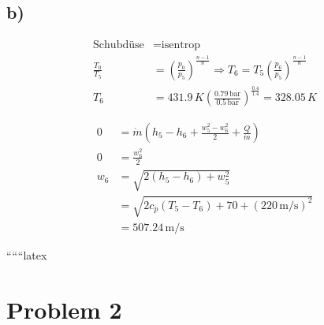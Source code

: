 

\subsection*{b)}

\begin{align*}
\text{Schubdüse} & = \text{isentrop} \\
\frac{T_0}{T_5} & = \left( \frac{p_0}{p_5} \right)^{\frac{n-1}{n}} \Rightarrow T_6 = T_5 \left( \frac{p_6}{p_5} \right)^{\frac{n-1}{n}} \\
T_6 & = 431.9 \, K \left( \frac{0.79 \, \text{bar}}{0.5 \, \text{bar}} \right)^{\frac{0.4}{1.4}} = 328.05 \, K
\end{align*}


\begin{align*}
0 & = \dot{m} (h_5 - h_6 + \frac{w_5^2 - w_6^2}{2} + \frac{Q}{\dot{m}}) \\
0 & = \frac{w_6^2}{2} \\
w_6 & = \sqrt{2 (h_5 - h_6) + w_5^2} \\
& = \sqrt{2 c_p (T_5 - T_6) + 70 + (220 \, \text{m/s})^2} \\
& = 507.24 \, \text{m/s}
\end{align*}

``````latex


\section*{Problem 2}